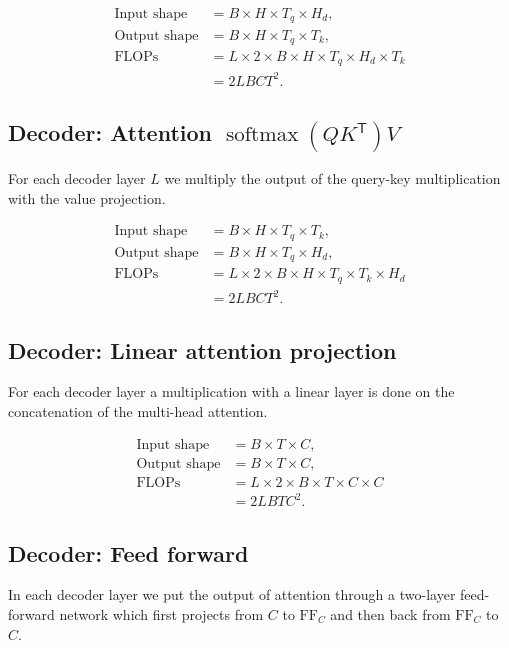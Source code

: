 \documentclass{article}
\begin{document}
\begin{align}
\text{Input shape}  &= \boxed{B \times H \times T_q \times H_d}, \\
\text{Output shape} &= \boxed{B \times H \times T_q \times T_k}, \\
\text{FLOPs}
   &= L \times 2 \times B \times H \times T_q \times H_d \times T_k \\
   &= \boxed{2L BCT^2}.
\end{align}

\subsection{Decoder: Attention $\operatorname{softmax}(QK^{\mathsf{T}})V$}

For each decoder layer $L$ we multiply the output of the query-key multiplication with the value projection.

\begin{align}
\text{Input shape}  &= \boxed{B \times H \times T_q \times T_k}, \\
\text{Output shape} &= \boxed{B \times H \times T_q \times H_d}, \\
\text{FLOPs}
   &= L \times 2 \times B \times H \times T_q \times T_k \times H_d \\
   &= \boxed{2L BCT^2}.
\end{align}


\subsection{Decoder: Linear attention projection}

For each decoder layer a multiplication with a linear layer is done on the concatenation of the multi-head attention.

\begin{align}
\text{Input shape}  &= \boxed{B \times T \times C}, \\
\text{Output shape} &= \boxed{B \times T \times C}, \\
\text{FLOPs}
   &= L \times 2 \times B \times T \times C \times C\\
   &= \boxed{2LBTC^2}.
\end{align}


\subsection{Decoder: Feed forward}

In each decoder layer we put the output of attention through a two-layer feed-forward network which first projects from $C$ to $\mathrm{FF}_C$ and then back from $\mathrm{FF}_C$ to $C$.
\end{document}

